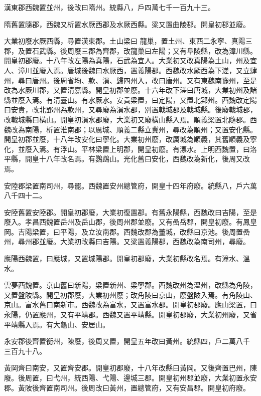 \begin{pinyinscope}
 漢東郡西魏置並州，後改曰隋州。統縣八，戶四萬七千一百九十三。



 隋舊置隨郡，西魏又析置水厥西郡及水厥西縣。梁又置曲陵郡。開皇初郡並廢。



 大業初廢水厥西縣，尋置漢東郡。土山梁曰
 龍巢，置土州、東西二永寧、真陽三郡，及置石武縣。後周廢三郡為齊郡，改龍巢曰左陽；又有阜陵縣，改為漳川縣。開皇初郡廢。十八年改左陽為真陽，石武為宜人。大業初又改真陽為土山，州及宜人、漳川並廢入焉。唐城後魏曰水厥西，置義陽郡。西魏改水厥西為下溠，又立肆州，尋曰唐州。後周省均、款、溳、歸四州入，改曰唐州。又有東魏南豫州，至是改為水厥川郡，又置清嘉縣。開皇初郡並廢。十六年改下溠曰唐城，大業初州及諸縣並廢入焉。有清臺山。有水厥水。安貴梁置，曰定陽，又置北郢州。西魏改定陽曰安貴，改北郢州為款州，又尋廢為溳水郡，別置戟城郡及戟城縣。後廢戟城郡，改戟城縣曰橫山。開皇初溳水郡廢，大業初又廢橫山縣入焉。順義梁置北隨郡。西魏改為南陽，析置淮南郡；以厲城、順義二縣立冀州，尋改為順州；又置安化縣。開皇初郡並廢，十八年改安化曰寧化。大業初州廢，改厲城為順義，其舊順義及寧化，並廢入焉。有浮山。平林梁置上明郡，開皇初廢。有漂水。上明西魏置，曰洛平縣，開皇十八年改名焉。有鸚鵡山。光化舊曰安化，西魏改為新化，後周又改焉。



 安陸郡梁置南司州，尋罷。西魏置安州總管府，開皇十四年府廢。統縣八，戶六萬八千四十二。



 安陸舊置安陸郡。開皇初郡廢，大業初復置郡。有舊永陽縣，西魏改曰吉陽，至是廢入。孝昌西魏置岳州及岳山郡，後周州郡並廢。又有嵒岳郡，開皇初廢。有鳳皇岡。吉陽梁置，曰平陽，及立汝南郡。西魏改郡為董城，改縣曰京池。後周置嵒州，尋州郡並廢。大業初改縣曰吉陽。又梁置義陽郡，西魏改為南司州，尋廢。



 應陽西魏置，曰應城，又置城陽郡。開皇初郡廢，大業初縣改名焉。有潼水、溫水。



 雲夢西魏置。京山舊曰新陽，梁置新州、梁寧郡。西魏改州為溫州，改縣為角陵，又置盤陂縣。開皇初郡廢，大業初州廢；改角陵曰京山，廢盤陂入焉。有角陵山、京山。富水舊曰南新市。西魏改為富水，又置富水郡。開皇初郡廢。應山梁置，曰永陽，仍置應州，又有平靖郡。西魏又置平靖縣。開皇初郡廢，大業初州廢，又省平靖縣入焉。有大龜山、安居山。



 永安郡後齊置衡州，陳廢，後周又置，開皇五年改曰黃州。統縣四，戶二萬八千
 三百九十八。



 黃岡齊曰南安，又置齊安郡。開皇初郡廢，十八年改縣曰黃岡。又後齊置巴州，陳廢。後周置，曰弋州，統西陽、弋陽、邊城三郡。開皇初州郡並廢，大業初置永安郡。黃陂後齊置南司州。後周改曰黃州，置總管府，又有安昌郡。開皇初府廢。




\end{pinyinscope}
